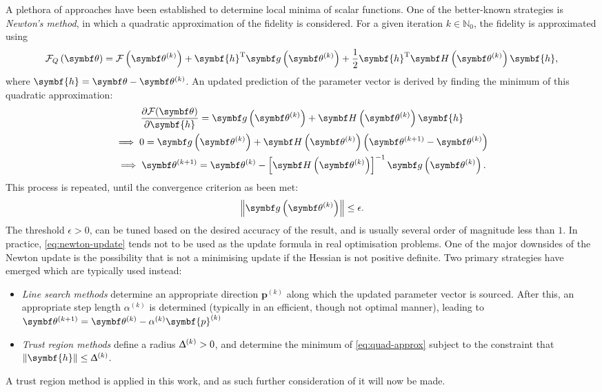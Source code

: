 A plethora of approaches have been established to determine local minima of
scalar functions. One of the better-known strategies is \emph{Newton's method},
in which a quadratic approximation of the fidelity is considered.
For a given iteration $k \in \mathbb{N}_0$, the fidelity is approximated using
\begin{equation}
    \FQth =
        \Fthk +
        \symbf{h}\T \bdgthk +
        \frac{1}{2} \symbf{h}^{\mathrm{T}} \bdHthk \symbf{h},
    \label{eq:quad-approx}
\end{equation}
where $\symbf{h} = \bth - \bthk$.  An updated prediction of the parameter
vector is derived by finding the minimum of this quadratic approximation:
\begin{gather}
    \frac{\partial \Fth}{\partial \symbf{h}} =
        \bdgthk + \bdHthk \symbf{h} \notag\\
    \implies 0 = \bdgthk + \bdHthk \left(\bthkplusone - \bthk\right) \notag\\
    \implies \bthkplusone =
        \bthk - \left[\bdHthk\right]^{-1}
        \bdgthk.\label{eq:newton-update}
\end{gather}
This process is repeated, until the convergence criterion as been met:
\begin{equation}
    \left\lVert \bdgthk \right\rVert \leq \epsilon.
\end{equation}
The threshold $\epsilon > 0$, can be tuned based on the desired accuracy of the
result, and is usually several order of magnitude less than $1$.
In practice, \eqref{eq:newton-update} tends not to be used as the
update formula in real optimisation problems. One of the major downsides of the
Newton update is the possibility that is not a minimising update if the Hessian
is not positive definite. Two primary strategies have emerged which are
typically used instead:
\begin{itemize}[
    label={},%
    leftmargin=*,%
]
    \item \emph{Line search methods}\cite[Chapter 3]{Nocedal2006} determine an
        appropriate direction $\symbf{p}^{(k)}$ along which the updated
        parameter vector is sourced.  After this, an appropriate step length
        $\alpha^{(k)}$ is determined (typically in an efficient, though not
        optimal manner), leading to $\bthkplusone = \bthk -
        \alpha^{(k)}\symbf{p}^{(k)}$
    \item \emph{Trust region methods}\cite[Chapter 4]{Nocedal2006} define a
        radius $\Updelta^{(k)} > 0$, and determine the minimum of
        \eqref{eq:quad-approx} subject to the constraint that
        $\left\lVert\symbf{h}\right\rVert \leq \Updelta^{(k)}$.
\end{itemize}
A trust region method is applied in this work, and as such further
consideration of it will now be made.

